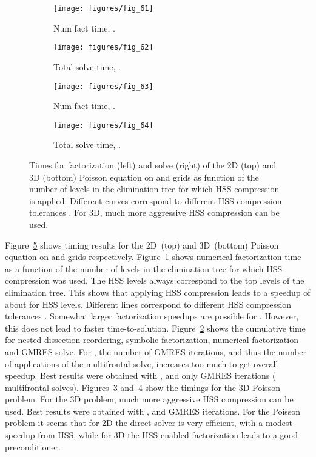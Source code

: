 \documentclass{article}
\begin{document}
\begin{figure}
  \begin{center}
    \begin{subfigure}{.49\textwidth}
      \texttt{[image: figures/fig\_61]}
      \caption{\footnotesize Num fact time, .}
      \label{fig:61}
    \end{subfigure}
    \begin{subfigure}{.49\textwidth}
      \texttt{[image: figures/fig\_62]}
      \caption{\footnotesize Total solve time, .}
      \label{fig:62}
    \end{subfigure}
    \begin{subfigure}{.49\textwidth}
      \texttt{[image: figures/fig\_63]}
      \caption{\footnotesize Num fact time, .}
      \label{fig:63}
    \end{subfigure}
    \begin{subfigure}{.49\textwidth}
      \texttt{[image: figures/fig\_64]}
      \caption{\footnotesize Total solve time, .}
      \label{fig:64}
    \end{subfigure}
  \end{center}
  \caption{\footnotesize Times for factorization (left) and solve (right) of
    the 2D (top) and 3D (bottom) Poisson equation on  and
     grids as function of the number of levels  in the
    elimination tree for which HSS compression is applied. Different
    curves correspond to different HSS compression tolerances
    . For 3D, much more aggressive HSS compression can be
    used.}
  \label{fig:Poisson2D3D}
\end{figure}
Figure~\ref{fig:Poisson2D3D} shows timing results for the 2D~(top) and
3D~(bottom) Poisson equation on  and  grids
respectively. Figure~\ref{fig:61} shows numerical factorization time
as a function of the number of levels in the elimination tree for
which HSS compression was used. The HSS levels always correspond to
the top levels of the elimination tree. This shows that applying HSS
compression leads to a speedup of about  for  HSS
levels. Different lines correspond to different HSS compression
tolerances . Somewhat larger factorization speedups are
possible for . However, this does not lead
to faster time-to-solution. Figure~\ref{fig:62} shows the cumulative
time for nested dissection reordering, symbolic factorization,
numerical factorization and GMRES solve. For , the number of GMRES iterations, and thus the number of
applications of the multifrontal solve, increases too much to get
overall speedup. Best results were obtained with ,
 and only  GMRES iterations (
multifrontal solves). Figures~\ref{fig:63} and~\ref{fig:64} show the
timings for the 3D Poisson problem. For the 3D problem, much more
aggressive HSS compression can be used. Best results were obtained
with ,  and  GMRES iterations. For
the Poisson problem it seems that for 2D the direct solver is very
efficient, with a modest speedup from HSS, while for 3D the HSS
enabled factorization leads to a good preconditioner.
\end{document}
